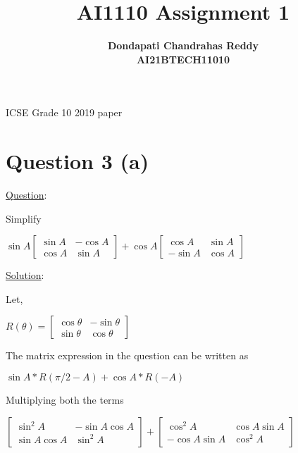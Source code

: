 \documentclass[journal,12pt,twocolumn]{IEEEtran}
\begin{document}
\title{\textbf{AI1110 Assignment 1} }
\author{\textbf{Dondapati Chandrahas Reddy}\\\textbf{AI21BTECH11010}}
\maketitle
\begin{center}
{ ICSE Grade 10 2019 paper}\end{center}\par
{ \section {Question 3 (a) \newline}}
{\Large \underline{Question}:\newline}

Simplify 
\begin{center}$\sin A\left [\begin{array}{cc}\sin A &  -\cos A \\
\cos A & \sin A\end{array}\right ]+\cos A\left [\begin{array}{cc}\cos A &  \sin A \\
-\sin A & \cos A\end{array}\right ]$\newline\end{center}\par

{\Large \underline{Solution}: \newline }\par
Let,
\begin{center}$R(\theta) =\left [\begin{array}{cc}\cos \theta &  -\sin \theta \\
\sin \theta & \cos \theta\end{array}\right ]$\newline\end{center}\par

The matrix expression in the question can be written as

\begin{center}
$\sin A \ast R(\pi/2 - A) +\cos A \ast R( -A)$\newline 
\end{center}\par

Multiplying both the terms

\begin{center}
\flushleft $\left [\begin{array}{cc}\sin^2 A &  -\sin A\cos A \\
\sin A\cos A & \sin^2 A\end{array}\right ] +$\flushright $\left [\begin{array}{cc}\cos^2 A & \cos A\sin A \\
 -\cos A\sin A & \cos^2 A\end{array}\right ]$\newline
\end{center}\par
\end{document}
